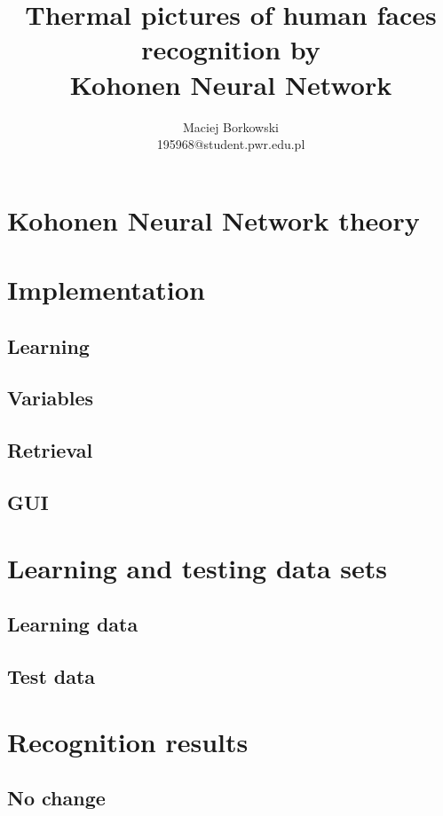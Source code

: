 \documentclass[pdftex]{article}
\date{}
\title{\vspace{10ex}Thermal pictures of human faces recognition by \\ Kohonen Neural Network \vspace{32ex}}
\author{Maciej Borkowski\\ 195968@student.pwr.edu.pl}
\begin{document}
\thispagestyle{empty}
\maketitle

\clearpage
\section{Kohonen Neural Network theory}

\section{Implementation}
\subsection{Learning}

\subsection{Variables}

\subsection{Retrieval}

\subsection{GUI}

\section{Learning and testing data sets}
\subsection{Learning data}

\subsection{Test data}

\section{Recognition results}
\subsection{No change}
\end{document}
